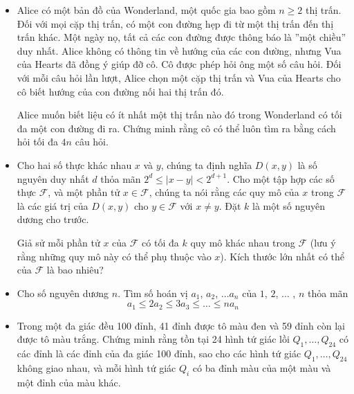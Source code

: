 \documentclass[11pt]{scrartcl}
\begin{document}
\begin{itemize}[label=, leftmargin=0em, itemsep=-0em]
    \item \begin{btvn}
        Alice có một bản đồ của Wonderland, một quốc gia bao gồm $n \geq 2$ thị trấn. Đối với mọi cặp thị trấn, có một con đường hẹp đi từ một thị trấn đến thị trấn khác. Một ngày nọ, tất cả các con đường được thông báo là ''một chiều'' duy nhất. Alice không có thông tin về hướng của các con đường, nhưng Vua của Hearts đã đồng ý giúp đỡ cô. Cô được phép hỏi ông một số câu hỏi. Đối với mỗi câu hỏi lần lượt, Alice chọn một cặp thị trấn và Vua của Hearts cho cô biết hướng của con đường nối hai thị trấn đó.

        Alice muốn biết liệu có ít nhất một thị trấn nào đó trong Wonderland có tối đa một con đường đi ra. Chứng minh rằng cô có thể luôn tìm ra bằng cách hỏi tối đa $4n$ câu hỏi.
    \end{btvn}

    \item \begin{btvn}
        Cho hai số thực khác nhau $x$ và $y$, chúng ta định nghĩa $D(x,y)$ là số nguyên duy nhất $d$ thỏa mãn $2^d\le |x-y| < 2^{d+1}$. Cho một tập hợp các số thực $\mathcal F$, và một phần tử $x\in \mathcal F$, chúng ta nói rằng các quy mô của $x$ trong $\mathcal F$ là các giá trị của $D(x,y)$ cho $y\in\mathcal F$ với $x\neq y$. Đặt $k$ là một số nguyên dương cho trước.

        Giả sử mỗi phần tử $x$ của $\mathcal F$ có tối đa $k$ quy mô khác nhau trong $\mathcal F$ (lưu ý rằng những quy mô này có thể phụ thuộc vào $x$). Kích thước lớn nhất có thể của $\mathcal F$ là bao nhiêu?
    \end{btvn}

    \item \begin{btvn}
        Cho số nguyên dương $n$. Tìm số hoán vị $a_1$, $a_2$, $\dots a_n$ của $1$, $2$, $\dots$ , $n$ thỏa mãn
        $$a_1 \le 2a_2\le 3a_3 \le \dots \le na_n$$
    \end{btvn}

    \item \begin{btvn}
        Trong một đa giác đều 100 đỉnh, 41 đỉnh được tô màu đen và 59 đỉnh còn lại được tô màu trắng. Chứng minh rằng tồn tại 24 hình tứ giác lồi $Q_{1}, \ldots, Q_{24}$ có các đỉnh là các đỉnh của đa giác 100 đỉnh, sao cho các hình tứ giác $Q_{1}, \ldots, Q_{24}$ không giao nhau, và mỗi hình tứ giác $Q_{i}$ có ba đỉnh màu của một màu và một đỉnh của màu khác.
    \end{btvn}


\end{itemize}
\end{document}
